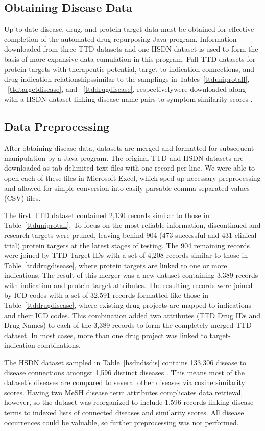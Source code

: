 \documentclass{IEEEtran}
\begin{document}
	\subsection{Obtaining Disease Data}
	Up-to-date disease, drug, and protein target data must be obtained for effective completion of the automated drug repurposing Java program.  Information downloaded from three TTD datasets and one HSDN dataset is used to form the basis of more expansive data cumulation in this program.  Full TTD datasets for protein targets with therapeutic potential, target to indication connections, and drug-indication relationships\textemdash similar to the samplings in Tables~\ref{ttduniprotall}, ~\ref{ttdtargetdisease}, and ~\ref{ttddrugdisease}, respectively\textemdash were downloaded along with a HSDN dataset linking disease name pairs to symptom similarity scores \cite{hsdn}.
	\subsection{Data Preprocessing}
	After obtaining disease data, datasets are merged and formatted for subsequent manipulation by a Java program.  The original TTD and HSDN datasets are downloaded as tab-delimited text files with one record per line.  We were able to open each of these files in Microsoft Excel, which sped up necessary preprocessing and allowed for simple conversion into easily parsable comma separated values (CSV) files.  
	
	The first TTD dataset contained 2,130 records similar to those in Table~\ref{ttduniprotall}.  To focus on the most reliable information, discontinued and research targets were pruned, leaving behind 904 (473 successful and 431 clinical trial) protein targets at the latest stages of testing.  The 904 remaining records were joined by TTD Target IDs with a set of 4,208 records similar to those in Table~\ref{ttddrugdisease}, where protein targets are linked to one or more indications.  The result of this merger was a new dataset containing 3,389 records with indication and protein target attributes.  The resulting records were joined by ICD codes with a set of 32,591 records formatted like those in Table~\ref{ttddrugdisease}, where existing drug projects are mapped to indications and their ICD codes.  This combination added two attributes (TTD Drug IDs and Drug Names) to each of the 3,389 records to form the completely merged TTD dataset.  In most cases, more than one drug project was linked to target-indication combinations.
	
	The HSDN dataset sampled in Table~\ref{hsdndisdis} contains 133,306 disease to disease connections amongst 1,596 distinct diseases \cite{hsdn}.  This means most of the dataset's diseases are compared to several other diseases via cosine similarity scores.  Having two MeSH disease term attributes complicates data retrieval, however, so the dataset was reorganized to include 1,596 records linking disease terms to indexed lists of connected diseases and similarity scores.  All disease occurrences could be valuable, so further preprocessing was not performed.
	
\end{document}
